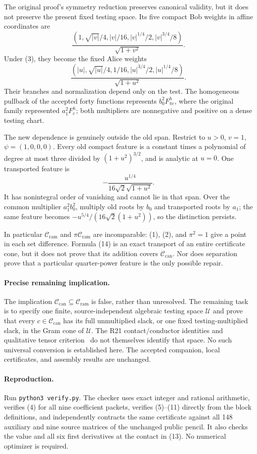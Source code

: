 \documentclass[10pt]{article}
\newcommand{\Cr}{\mathcal C_{\mathrm{ram}}}
\newcommand{\Cc}{\mathcal C_{\mathrm{can}}}
\begin{document}
The original proof's symmetry reduction preserves canonical validity,
but it does not preserve the present fixed testing space. Its five compact
Bob weights in affine coordinates are
\[
 \frac{(1,\sqrt{|v|}/4,|v|/16,|v|^{1/4}/2,|v|^{3/4}/8)}
      {\sqrt{1+v^2}}.
\]
Under (3), they become the fixed Alice weights
\[
 \boxed{
 \frac{(|u|,\sqrt{|u|}/4,1/16,|u|^{3/4}/2,|u|^{1/4}/8)}
      {\sqrt{1+u^2}}.}                                  \tag{14}
\]
Their branches and normalization depend only on the test. The homogeneous
pullback of the accepted forty functions represents $b_0^2F^h_{\pi c}$,
where the original family represented $a_1^2F^h_c$; both multipliers are
nonnegative and positive on a dense testing chart.

The new dependence is genuinely outside the old span. Restrict to
$u>0$, $v=1$, $\psi=(1,0,0,0)$. Every old compact feature is a constant
times a polynomial of degree at most three divided by $(1+u^2)^{3/2}$,
and is analytic at $u=0$. One transported feature is
\[
 -\frac{u^{1/4}}{16\sqrt2\sqrt{1+u^2}}.
\]
It has nonintegral order of vanishing and cannot lie in that span.
Over the common multiplier $a_1^2b_0^2$, multiply old roots by $b_0$ and
transported roots by $a_1$; the same feature becomes
$-u^{5/4}/(16\sqrt2(1+u^2))$, so the distinction persists.

In particular $\Cr$ and $\pi\Cr$ are incomparable: (1), (2), and
$\pi^2=1$ give a point in each set difference. Formula (14) is an exact
transport of an entire certificate cone, but it does not prove that its
addition covers $\Cc$. Nor does separation prove that a particular
quarter-power feature is the only possible repair.

\paragraph{Precise remaining implication.}
The implication $\Cc\subseteq\Cr$ is false, rather than unresolved.
The remaining task is to specify one finite, source-independent algebraic
testing space $\mathcal U$ and prove that every $c\in\Cc$ has its full
unmultiplied slack, or one fixed testing-multiplied slack, in the Gram cone
of $\mathcal U$. The R21 contact/conductor identities and qualitative
tensor criterion~\cite{companion} do not themselves identify that space.
No such universal conversion is established here. The accepted companion,
local certificates, and assembly results are unchanged.

\paragraph{Reproduction.}
Run \texttt{python3 verify.py}. The checker uses exact integer and rational
arithmetic, verifies (4) for all nine coefficient packets, verifies (5)--(11)
directly from the block definitions, and independently contracts the same
certificate against all 148 auxiliary and nine source matrices of the
unchanged public pencil. It also checks the value and all six first
derivatives at the contact in (13). No numerical optimizer is required.
\end{document}

